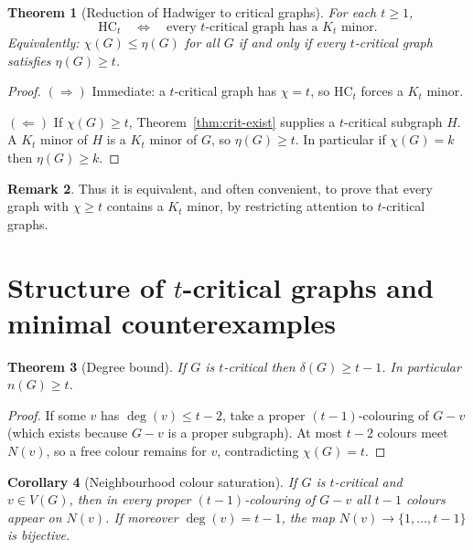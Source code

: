 \documentclass[11pt]{article}
\newtheorem{theorem}{Theorem}[section]
\newtheorem{corollary}[theorem]{Corollary}
\theoremstyle{definition}
\newtheorem{remark}[theorem]{Remark}
\newcommand{\had}{\eta}
\begin{document}
\begin{theorem}[Reduction of Hadwiger to critical graphs]\label{thm:crit-red}
For each \(t\ge 1\),
\[
\mathrm{HC}_t
\quad\Longleftrightarrow\quad
\text{every \(t\)-critical graph has a \(K_t\) minor}.
\]
Equivalently: \(\chi(G)\le\had(G)\) for all \(G\) if and only if every
\(t\)-critical graph satisfies \(\had(G)\ge t\).
\end{theorem}

\begin{proof}
\((\Rightarrow)\) Immediate: a \(t\)-critical graph has \(\chi=t\), so
\(\mathrm{HC}_t\) forces a \(K_t\) minor.

\((\Leftarrow)\) If \(\chi(G)\ge t\), Theorem~\ref{thm:crit-exist} supplies a
\(t\)-critical subgraph \(H\). A \(K_t\) minor of \(H\) is a \(K_t\) minor of
\(G\), so \(\had(G)\ge t\). In particular if \(\chi(G)=k\) then
\(\had(G)\ge k\).
\end{proof}

\begin{remark}
Thus it is equivalent, and often convenient, to prove that every graph with
\(\chi\ge t\) contains a \(K_t\) minor, by restricting attention to
\(t\)-critical graphs.
\end{remark}

\section{Structure of \(t\)-critical graphs and minimal counterexamples}

\begin{theorem}[Degree bound]\label{thm:delta}
If \(G\) is \(t\)-critical then \(\delta(G)\ge t-1\). In particular
\(n(G)\ge t\).
\end{theorem}

\begin{proof}
If some \(v\) has \(\deg(v)\le t-2\), take a proper \((t-1)\)-colouring of
\(G-v\) (which exists because \(G-v\) is a proper subgraph). At most \(t-2\)
colours meet \(N(v)\), so a free colour remains for \(v\), contradicting
\(\chi(G)=t\).
\end{proof}

\begin{corollary}[Neighbourhood colour saturation]\label{cor:N-sat}
If \(G\) is \(t\)-critical and \(v\in V(G)\), then in every proper
\((t-1)\)-colouring of \(G-v\) all \(t-1\) colours appear on \(N(v)\). If
moreover \(\deg(v)=t-1\), the map \(N(v)\to\{1,\dots,t-1\}\) is bijective.
\end{corollary}
\end{document}

